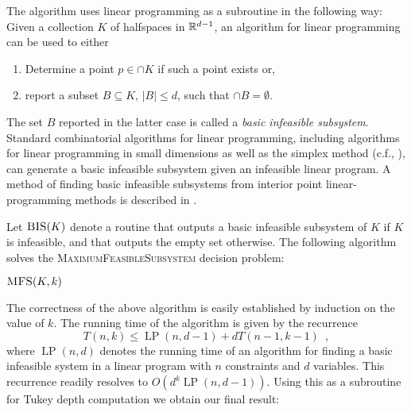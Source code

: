 \documentclass[charterfonts,lotsofwhite]{patmorin}
\DeclareMathOperator{\lp}{LP}
\begin{document}
The algorithm uses linear programming as a subroutine in the following
way:  Given a collection $K$ of halfspaces in $\mathbb{R}^{d-1}$, an algorithm
for linear programming can be used to either
\begin{enumerate}
\item Determine a point $p\in\cap K$ if such a point exists or,
\item report a subset $B\subseteq K$, $|B|\le d$, such that 
	$\cap B=\emptyset$.
\end{enumerate}
The set $B$ reported in the latter case is called a \emph{basic
infeasible subsystem}.  Standard combinatorial algorithms for linear
programming, including algorithms for linear programming in small
dimensions \cite{c95,d84,m83,m84,s91,sw92} as well as the simplex
method (c.f., \cite{chvatal80}), can generate a basic infeasible
subsystem given an infeasible linear program.  A method of finding
basic infeasible subsystems from interior point linear-programming
methods is described in .

Let $\textsc{BIS}(K)$ denote a routine that outputs a basic infeasible
subsystem of $K$ if $K$ is infeasible, and that outputs the empty set
otherwise.  The following algorithm solves the
\textsc{MaximumFeasibleSubsystem} decision problem:

\noindent\begin{minipage}{\textwidth}
\noindent$\textsc{MFS}(K,k)$
\begin{algorithmic}[1]
\ENDIF
{}
\ENDIF
{}
   \ENDIF
\ENDFOR
{}
\end{algorithmic}
\end{minipage}

The correctness of the above algorithm is easily established by
induction on the value of $k$.  The running time of the algorithm is
given by the recurrence
\[
    T(n,k) \le \lp(n,d-1)+ dT(n-1,k-1) \enspace ,
\]
where $\lp(n,d)$ denotes the running time of an algorithm for finding
a basic infeasible system in a linear program with $n$ constraints and
$d$ variables.  This recurrence readily resolves to
$O(d^k\lp(n,d-1))$.  
Using this as a subroutine for Tukey depth computation we obtain our
final result:
\end{document}
